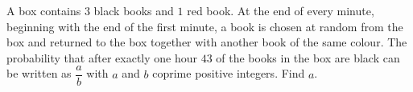 A box contains $3$ black books and $1$ red book. At the end of every minute, beginning with the end of the first minute, a book is chosen at random from the box and returned to the box together with another book of the same colour. The probability that after exactly one hour $43$ of the books in the box are black can be written as $\dfrac {a}{b}$ with $a$ and $b$ coprime positive integers. Find $a$.
